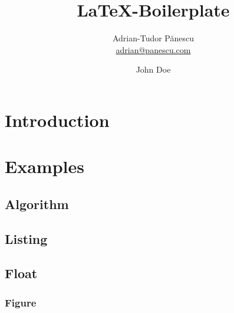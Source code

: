 \documentclass[12pt,a4paper,twoside]{report}
\author{
    Adrian-Tudor P\u{a}nescu \\
    \href{mailto:adrian@panescu.com}{adrian@panescu.com}
  \and
    John Doe
}
\title{\LaTeX-Boilerplate}
\date{}  %
\begin{document}
  

  

  \setcounter{page}{3}


  \begin{abstract}
    
  \end{abstract}

  \tableofcontents
  \listoffigures
  \listoftables
  \lstlistoflistings

  \cleardoublepage


  \chapter{Introduction}
    \label{sec:intro}
    

  \cleardoublepage

  \chapter{Examples}
    \label{sec:ex}
    

    \FloatBarrier

    \section{Algorithm}
      \label{sec:algo}
      

    \clearpage

    \section{Listing}
      \label{sec:lst}
      

    \clearpage

    \section{Float}
      \label{sec:float}
      

      \FloatBarrier

      \subsection{Figure}
        \label{sec:fig}
        
\end{document}
